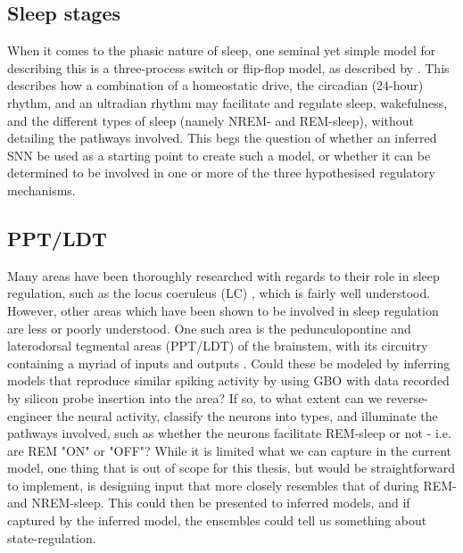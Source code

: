 \documentclass[mphil,deptreport,ianc]{infthesis} %
\begin{document}
\subsection{Sleep stages}

When it comes to the phasic nature of sleep, one seminal yet simple model for describing this is a three-process switch or flip-flop model, as described by \cite{Borbely1992}.
This describes how a combination of a homeostatic drive, the circadian (24-hour) rhythm, and an ultradian rhythm may facilitate and regulate sleep, wakefulness, and the different types of sleep (namely NREM- and REM-sleep), without detailing the pathways involved.
This begs the question of whether an inferred SNN be used as a starting point to create such a model, or whether it can be determined to be involved in one or more of the three hypothesised regulatory mechanisms.

\subsection{PPT/LDT}

Many areas have been thoroughly researched with regards to their role in sleep regulation, such as the locus coeruleus (LC) \cite{Mallick2001, DinizBehn2010, Brown2012, Khanday2016a}, which is fairly well understood.
However, other areas which have been shown to be involved in sleep regulation are less or poorly understood.
One such area is the pedunculopontine and laterodorsal tegmental areas (PPT/LDT) of the brainstem, with its circuitry containing a myriad of inputs and outputs \cite{Pal2005, Brown2012, VanDort2015, Herice2019a}.
Could these be modeled by inferring models that reproduce similar spiking activity by using GBO with data recorded by silicon probe insertion into the area?
If so, to what extent can we reverse-engineer the neural activity, classify the neurons into types, and illuminate the pathways involved, such as whether the neurons facilitate REM-sleep or not - i.e. are REM "ON" or "OFF"?
While it is limited what we can capture in the current model, one thing that is out of scope for this thesis, but would be straightforward to implement, is designing input that more closely resembles that of during REM- and NREM-sleep.
This could then be presented to inferred models, and if captured by the inferred model, the ensembles could tell us something about state-regulation.
\end{document}
